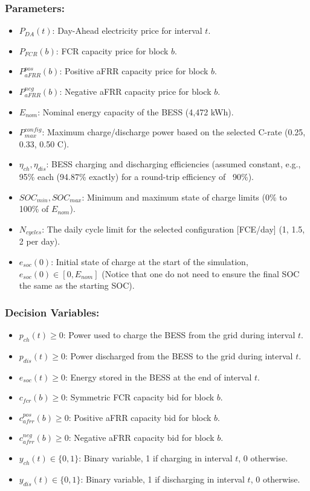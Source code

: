 \subsubsection{Parameters:}
\begin{itemize}
    \item $P_{DA}(t)$: Day-Ahead electricity price for interval $t$.
    \item $P_{FCR}(b)$: FCR capacity price for block $b$.
    \item $P_{aFRR}^{pos}(b)$: Positive aFRR capacity price for block $b$.
    \item $P_{aFRR}^{neg}(b)$: Negative aFRR capacity price for block $b$.
    \item $E_{nom}$: Nominal energy capacity of the BESS (4,472 kWh).
    \item $P_{max}^{config}$: Maximum charge/discharge power based on the selected C-rate (0.25, 0.33, 0.50 C).
    \item $\eta_{ch}, \eta_{dis}$: BESS charging and discharging efficiencies (assumed constant, e.g., 95\% each (94.87\% exactly) for a round-trip efficiency of ~90\%).
    \item $SOC_{min}, SOC_{max}$: Minimum and maximum state of charge limits (0\% to 100\% of $E_{nom}$).
    \item $N_{cycles}$: The daily cycle limit for the selected configuration [FCE/day] (1, 1.5, 2 per day).
    \item $e_{soc}(0)$: Initial state of charge at the start of the simulation, $e_{soc}(0) \in [0, E_{nom}] $ (Notice that one do not need to ensure the final SOC the same as the starting SOC).
\end{itemize}

\subsubsection{Decision Variables:}
\begin{itemize}
    \item $p_{ch}(t) \geq 0$: Power used to charge the BESS from the grid during interval $t$.
    \item $p_{dis}(t) \geq 0$: Power discharged from the BESS to the grid during interval $t$.
    \item $e_{soc}(t) \geq 0$: Energy stored in the BESS at the end of interval $t$.
    \item $c_{fcr}(b) \geq 0$: Symmetric FCR capacity bid for block $b$.
    \item $c_{afrr}^{pos}(b) \geq 0$: Positive aFRR capacity bid for block $b$.
    \item $c_{afrr}^{neg}(b) \geq 0$: Negative aFRR capacity bid for block $b$.
    \item $y_{ch}(t) \in \{0,1\}$: Binary variable, 1 if charging in interval $t$, 0 otherwise.
    \item $y_{dis}(t) \in \{0,1\}$: Binary variable, 1 if discharging in interval $t$, 0 otherwise.
\end{itemize}
